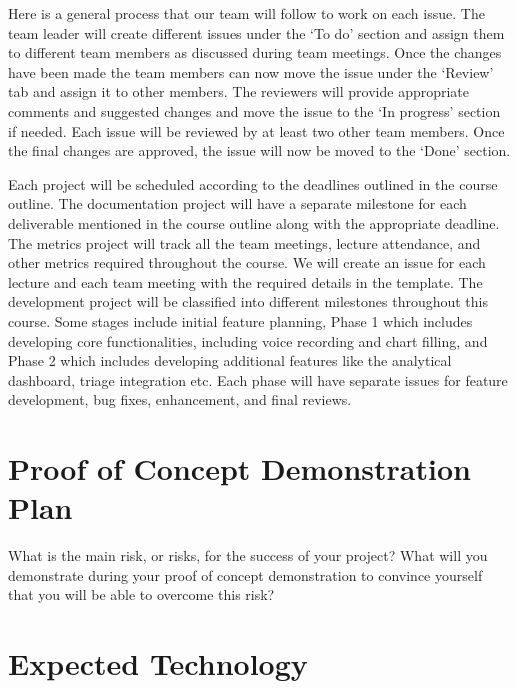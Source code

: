 \documentclass{article}
\begin{document}
Here is a general process that our team will follow to work on each issue. The team leader will create different issues under the ‘To do’ section and assign them to different team members as discussed during team meetings. Once the changes have been made the team members can now move the issue under the ‘Review’ tab and assign it to other members. The reviewers will provide appropriate comments and suggested changes and move the issue to the ‘In progress’ section if needed. Each issue will be reviewed by at least two other team members. Once the final changes are approved, the issue will now be moved to the ‘Done’ section. 

Each project will be scheduled according to the deadlines outlined in the course outline. The documentation project will have a separate milestone for each deliverable mentioned in the course outline along with the appropriate deadline. The metrics project will track all the team meetings, lecture attendance, and other metrics required throughout the course. We will create an issue for each lecture and each team meeting with the required details in the template. The development project will be classified into different milestones throughout this course. Some stages include initial feature planning, Phase 1 which includes developing core functionalities, including voice recording and chart filling, and Phase 2 which includes developing additional features like the analytical dashboard, triage integration etc. Each phase will have separate issues for feature development, bug fixes, enhancement, and final reviews. 

\section{Proof of Concept Demonstration Plan}

What is the main risk, or risks, for the success of your project?  What will you
demonstrate during your proof of concept demonstration to convince yourself that
you will be able to overcome this risk?

\section{Expected Technology}

\end{document}
